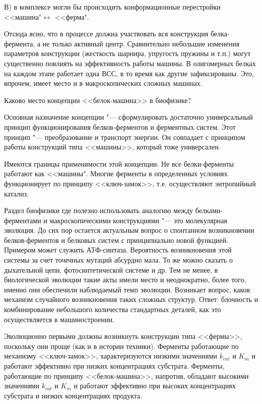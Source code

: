 \documentclass[12pt,a4paper,oneside]{book}
\begin{document}
В) в комплексе могли бы происходить конформационные перестройки <<машина"$ \leftrightarrow $ <<ферма".

Отсюда ясно, что в процессе должна участвовать вся конструкция белка-фермента, а не только активный центр. Сравнительно небольшие изменения параметров конструкции (жесткость шарнира, упругость пружины и т.п.) могут существенно повлиять на эффективность работы машины. 
В олигомерных белках на каждом этапе работает одна ВСС, в то время как другие зафиксированы. Это, впрочем, имеет место и в макроскопических сложных машинах.

Каково место концепции <<белок-машина>> в биофизике?

Основная назначение концепции "--- сформулировать достаточно универсальный принцип функционирования белков-ферментов и ферментных систем. Этот принцип "--- преобразование и транспорт энергии. Он совпадает с принципом работы конструкций типа <<машины>>, который тоже универсален. 

Имеются границы применимости этой концепции. Не все белки-ферменты работают как <<машины". Многие ферменты в определенных условиях функционирует по принципу <<ключ-замок>>, т.е. осуществляют энтропийный катализ.   

Раздел биофизики где полезно использовать аналогию между белками-ферментами и макроскопическими конструкциями "--- это молекулярная эволюция. 
До сих пор остается актуальным вопрос о спонтанном возникновении белков-ферментов и белковых систем с принципиально новой функцией. Примером может служить АТФ-синтаза. Вероятность возникновения этой системы за счет точечных мутаций абсурдно мала. То же можно сказать о дыхательной цепи, фотосинтетической системе и др. Тем не менее, в биологической эволюции такие акты имели место и неоднократно, более того, именно они обеспечили наблюдаемый темп эволюции. Возникает вопрос, каков механизм случайного возникновения таких сложных структур. Ответ: блочность и комбинирование небольшого количества стандартных деталей, как это осуществляется в машиностроении. 

Эволюционно первыми должны возникнуть конструкции типа <<фермы>>, поскольку они проще (как и в истории техники). Ферменты работающие по механизму <<ключ-замок>>, характеризуются низкими значениями $ k_{cat} $ и $ K_m $  и работают эффективно при низких  концентрациях субстрата. Ферменты, работающие по принципу <<белок-машина>>, напротив, обладают высокими значениями $ k_{cat} $ и $ K_m $ и работают эффективно при высоких концентрациях субстрата и низких концентрациях продукта. 
\end{document}
